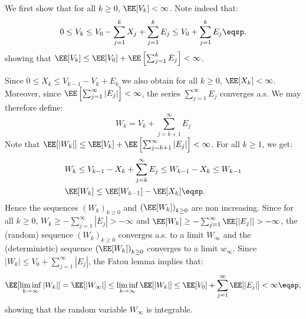 \documentclass[11pt]{article}
\makeatletter
\renewenvironment{proof}[1][\proofname]{%
   \par\pushQED{\qed}\normalfont%
   \topsep6\p@\@plus6\p@\relax
   \trivlist\item[\hskip\labelsep\bfseries#1]%
   \ignorespaces
}{%
   \popQED\endtrivlist\@endpefalse
}
\theoremstyle{t}
\makeatother
\begin{document}
\begin{proof}
  We first show that for all $k \geq 0$, $\EE[V_k] < \infty$. Note indeed that:
\begin{equation}
0 \leq V_k \leq V_0 - \sum_{j=1}^{k}{X_j} + \sum_{j=1}^{k}{E_j}\leq V_0 + \sum_{j=1}^{k}{E_j} \eqsp,
\end{equation}
showing that $\EE[V_k] \leq \EE[V_0] + \EE\left[\sum_{j=1}^{k}{E_j}\right] < \infty$.

Since $0 \leq X_k \leq V_{k-1} - V_k + E_k$ we also obtain for all $k \geq 0$, $\EE[X_k] < \infty$. Moreover, since $\EE\left[\sum_{j=1}^{\infty}{|E_j|}\right] < \infty$, the series $\sum_{j=1}^{\infty}{E_j}$ converges a.s. We may therefore define:
\begin{equation}
W_k = V_k + \sum_{j=k+1}^{\infty}{E_j}
\end{equation}
Note that $\EE[|W_k|] \leq \EE[V_k]+\EE\left[\sum_{j=k+1}^{\infty}{|E_j|}\right] < \infty $. For all $k \geq 1$, we get:
\begin{equation}\label{chik}
\begin{split}
& W_{k} \leq V_{k-1} - X_{k} + \sum_{j=k}^{\infty}{E_j} \leq W_{k-1} - X_{k}\leq W_{k-1}\\
&\EE[W_k] \leq \EE[W_{k-1}] - \EE[X_{k}] \eqsp.
\end{split}
\end{equation}
Hence the sequences $(W_k)_{k\geq0}$ and $\left(\EE[W_k] \right)_{k\geq0}$ are non increasing. Since for all $k \geq 0$, $W_k \geq -  \sum_{j=1}^{\infty}{|E_j|} > -\infty$ and $\EE[W_k] \geq -  \sum_{j=1}^{\infty}{\EE[|E_j|]} > -\infty$, the (random) sequence $(W_k)_{k\geq0}$ converges a.s. to a limit $W_{\infty}$ and the (deterministic) sequence $\left(\EE[W_k] \right)_{k\geq0}$ converges to a limit $w_{\infty}$. Since $|W_k| \leq V_0 +  \sum_{j=1}^{\infty}{|E_j|}$, the Fatou lemma implies that:
\begin{equation}
\EE[\liminf \limits_{k \to \infty} |W_k|] = \EE[|W_{\infty}|] \leq \liminf \limits_{k \to \infty} \EE[|W_{k}|] \leq \EE[V_{0}] + \sum_{j=1}^{\infty}{\EE[|E_j|]}< \infty \eqsp,
\end{equation}
showing that the random variable $W_{\infty}$  is integrable.


\end{proof}
\end{document}
